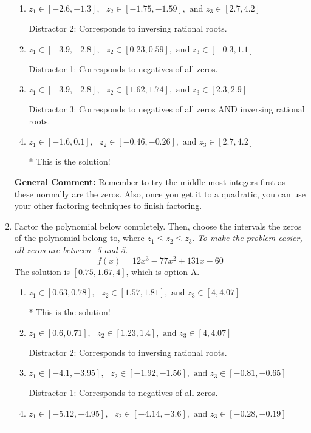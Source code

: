 \documentclass{extbook}[14pt]
\newcommand{\litem}[1]{\item #1

\rule{\textwidth}{0.4pt}}
\begin{document}
\begin{enumerate}
{\begin{enumerate}[label=\Alph*.]
 Distractor 4: Corresponds to moving factors from one rational to another.
\item \( z_1 \in [-2.6, -1.3], \text{   }  z_2 \in [-1.75, -1.59], \text{   and   } z_3 \in [2.7, 4.2] \)

 Distractor 2: Corresponds to inversing rational roots.
\item \( z_1 \in [-3.9, -2.8], \text{   }  z_2 \in [0.23, 0.59], \text{   and   } z_3 \in [-0.3, 1.1] \)

 Distractor 1: Corresponds to negatives of all zeros.
\item \( z_1 \in [-3.9, -2.8], \text{   }  z_2 \in [1.62, 1.74], \text{   and   } z_3 \in [2.3, 2.9] \)

 Distractor 3: Corresponds to negatives of all zeros AND inversing rational roots.
\item \( z_1 \in [-1.6, 0.1], \text{   }  z_2 \in [-0.46, -0.26], \text{   and   } z_3 \in [2.7, 4.2] \)

* This is the solution!
\end{enumerate}

\textbf{General Comment:} Remember to try the middle-most integers first as these normally are the zeros. Also, once you get it to a quadratic, you can use your other factoring techniques to finish factoring.
}
\litem{
Factor the polynomial below completely. Then, choose the intervals the zeros of the polynomial belong to, where $z_1 \leq z_2 \leq z_3$. \textit{To make the problem easier, all zeros are between -5 and 5.}
\[ f(x) = 12x^{3} -77 x^{2} +131 x -60 \]The solution is \( [0.75, 1.67, 4] \), which is option A.\begin{enumerate}[label=\Alph*.]
\item \( z_1 \in [0.63, 0.78], \text{   }  z_2 \in [1.57, 1.81], \text{   and   } z_3 \in [4, 4.07] \)

* This is the solution!
\item \( z_1 \in [0.6, 0.71], \text{   }  z_2 \in [1.23, 1.4], \text{   and   } z_3 \in [4, 4.07] \)

 Distractor 2: Corresponds to inversing rational roots.
\item \( z_1 \in [-4.1, -3.95], \text{   }  z_2 \in [-1.92, -1.56], \text{   and   } z_3 \in [-0.81, -0.65] \)

 Distractor 1: Corresponds to negatives of all zeros.
\item \( z_1 \in [-5.12, -4.95], \text{   }  z_2 \in [-4.14, -3.6], \text{   and   } z_3 \in [-0.28, -0.19] \)


\end{enumerate}}
\end{enumerate}
\end{document}
